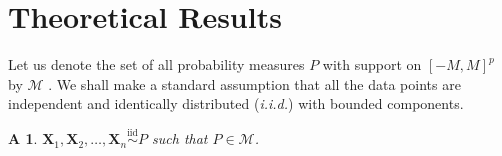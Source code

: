 \documentclass{article}
\newcommand{\bX}{\boldsymbol{X}}
\newcommand{\bTheta}{\boldsymbol{\Theta}}
\newtheorem{assumption}{A\hspace{-2pt}}
\begin{document}
\section{Theoretical Results}
\label{sec:theory}









Let us denote the set of all probability measures $P$ with support on $[-M,M]^p$ by $\mathcal{M}$%
. We shall make a standard assumption that all the data points are independent and identically distributed (\textit{i.i.d.}) with bounded components.

\begin{assumption}\label{ass-1-iid}
    $\bm{X}_1,\bm{X}_2,\ldots,\bm{X}_n \overset{\text{iid}}{\sim}P$ such that $P\in \mathcal{M}$.
\end{assumption}
\end{document}
